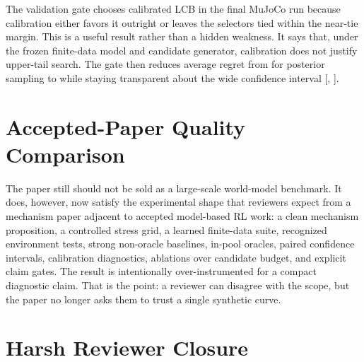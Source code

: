 \documentclass{article}
\begin{document}
The validation gate chooses calibrated LCB in the final MuJoCo run because
calibration either favors it outright or leaves the selectors tied within the
near-tie margin. This is a useful result rather than a hidden weakness. It says
that, under the frozen finite-data model and candidate generator, calibration
does not justify upper-tail search. The gate then reduces average regret from
\VFourMujocoSampleRegret{} for posterior sampling to
\VFourMujocoGateRegret{} while staying transparent about the wide confidence
interval [\VFourMujocoGateSampleCILow{}, \VFourMujocoGateSampleCIHigh{}].

\section{Accepted-Paper Quality Comparison}

The paper still should not be sold as a large-scale world-model benchmark. It
does, however, now satisfy the experimental shape that reviewers expect from a
mechanism paper adjacent to accepted model-based RL work: a clean mechanism
proposition, a controlled stress grid, a learned finite-data suite, recognized
environment tests, strong non-oracle baselines, in-pool oracles, paired
confidence intervals, calibration diagnostics, ablations over candidate
budget, and explicit claim gates. The result is intentionally over-instrumented
for a compact diagnostic claim. That is the point: a reviewer can disagree
with the scope, but the paper no longer asks them to trust a single synthetic
curve.

\section{Harsh Reviewer Closure}
\end{document}
